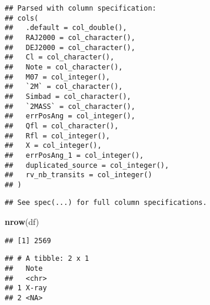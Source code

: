 \documentclass[]{article}
\newenvironment{Shaded}{\begin{snugshade}}{\end{snugshade}}
\newcommand{\CommentTok}[1]{\textcolor[rgb]{0.56,0.35,0.01}{\textit{#1}}}
\newcommand{\FloatTok}[1]{\textcolor[rgb]{0.00,0.00,0.81}{#1}}
\newcommand{\KeywordTok}[1]{\textcolor[rgb]{0.13,0.29,0.53}{\textbf{#1}}}
\newcommand{\NormalTok}[1]{#1}
\newcommand{\OperatorTok}[1]{\textcolor[rgb]{0.81,0.36,0.00}{\textbf{#1}}}
\newcommand{\StringTok}[1]{\textcolor[rgb]{0.31,0.60,0.02}{#1}}
\begin{document}
\begin{verbatim}
## Parsed with column specification:
## cols(
##   .default = col_double(),
##   RAJ2000 = col_character(),
##   DEJ2000 = col_character(),
##   Cl = col_character(),
##   Note = col_character(),
##   M07 = col_integer(),
##   `2M` = col_character(),
##   Simbad = col_character(),
##   `2MASS` = col_character(),
##   errPosAng = col_integer(),
##   Qfl = col_character(),
##   Rfl = col_integer(),
##   X = col_integer(),
##   errPosAng_1 = col_integer(),
##   duplicated_source = col_integer(),
##   rv_nb_transits = col_integer()
## )
\end{verbatim}

\begin{verbatim}
## See spec(...) for full column specifications.
\end{verbatim}

\begin{Shaded}
\begin{Highlighting}[]
\KeywordTok{nrow}\NormalTok{(df)}
\end{Highlighting}
\end{Shaded}

\begin{verbatim}
## [1] 2569
\end{verbatim}

\begin{Shaded}
\end{Shaded}

\begin{verbatim}
## # A tibble: 2 x 1
##   Note 
##   <chr>
## 1 X-ray
## 2 <NA>
\end{verbatim}
\end{document}
